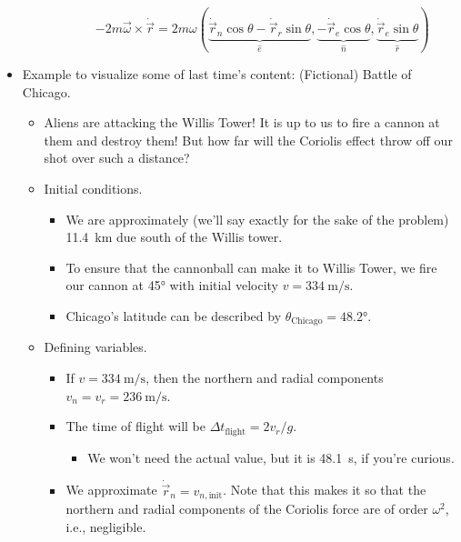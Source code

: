 \documentclass[../notes.tex]{subfiles}
\begin{document}
\begin{itemize}
\begin{itemize}
\begin{enumerate}
            \begin{equation*}
                -2m\vec{\omega}\times\dot{\vec{r}} = 2m\omega(\underbrace{\dot{\vec{r}}_n\cos\theta-\dot{\vec{r}}_r\sin\theta}_{\hat{e}},\underbrace{-\dot{\vec{r}}_e\cos\theta}_{\hat{n}},\underbrace{\dot{\vec{r}}_e\sin\theta}_{\hat{r}})
            \end{equation*}
        \end{enumerate}
    \end{itemize}
    \item Example to visualize some of last time's content: (Fictional) Battle of Chicago.
    \begin{itemize}
        \item Aliens are attacking the Willis Tower! It is up to us to fire a cannon at them and destroy them! But how far will the Coriolis effect throw off our shot over such a distance?
        \item Initial conditions.
        \begin{itemize}
            \item We are approximately (we'll say exactly for the sake of the problem) \SI{11.4}{\kilo\meter} due south of the Willis tower.
            \item To ensure that the cannonball can make it to Willis Tower, we fire our cannon at \ang{45} with initial velocity $v=\SI[per-mode=symbol]{334}{\meter\per\second}$.
            \item Chicago's latitude can be described by $\theta_\text{Chicago}=\ang{48.2}$.
        \end{itemize}
        \item Defining variables.
        \begin{itemize}
            \item If $v=\SI[per-mode=symbol]{334}{\meter\per\second}$, then the northern and radial components $v_n=v_r=\SI[per-mode=symbol]{236}{\meter\per\second}$.
            \item The time of flight will be $\Delta t_\text{flight}=2v_r/g$.
            \begin{itemize}
                \item We won't need the actual value, but it is \SI{48.1}{\second}, if you're curious.
            \end{itemize}
            \item We approximate $\dot{\vec{r}}_n=v_{n,\text{init}}$. Note that this makes it so that the northern and radial components of the Coriolis force are of order $\omega^2$, i.e., negligible.

\end{itemize}
\end{itemize}
\end{itemize}
\end{document}

